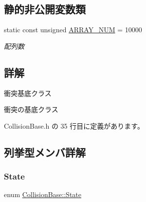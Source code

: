 \subsection*{静的非公開変数類}
\begin{DoxyCompactItemize}
\item 
static const unsigned \mbox{\hyperlink{class_collision_base_a0ddcdd5ed993b19c6edabd9c50e76ba4}{A\+R\+R\+A\+Y\+\_\+\+N\+UM}} = 10000
\begin{DoxyCompactList}\small\item\em 配列数 \end{DoxyCompactList}\end{DoxyCompactItemize}


\subsection{詳解}
衝突基底クラス 

衝突の基底クラス 

 Collision\+Base.\+h の 35 行目に定義があります。



\subsection{列挙型メンバ詳解}
\mbox{\label{class_collision_base_a4dd1ed00099a19c0176913af93c4e365}} 
\subsubsection{\texorpdfstring{State}{State}}
{\footnotesize\ttfamily enum \mbox{\hyperlink{class_collision_base_a4dd1ed00099a19c0176913af93c4e365}{Collision\+Base\+::\+State}}}

